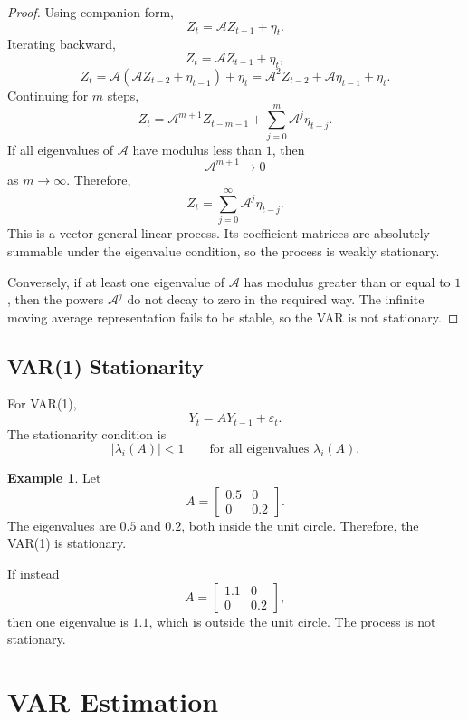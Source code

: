 \documentclass[12pt,oneside]{book}
\numberwithin{equation}{section}
\theoremstyle{definition}
\newtheorem{example}{Example}[section]
\theoremstyle{plain}
\theoremstyle{remark}
\begin{document}
\begin{proof}
Using companion form,
\[
Z_t=\mathcal{A}Z_{t-1}+\eta_t.
\]
Iterating backward,
\[
Z_t
=
\mathcal{A}Z_{t-1}+\eta_t,
\]
\[
Z_t
=
\mathcal{A}(\mathcal{A}Z_{t-2}+\eta_{t-1})+\eta_t
=
\mathcal{A}^2Z_{t-2}
+
\mathcal{A}\eta_{t-1}
+
\eta_t.
\]
Continuing for $m$ steps,
\[
Z_t
=
\mathcal{A}^{m+1}Z_{t-m-1}
+
\sum_{j=0}^{m}\mathcal{A}^j\eta_{t-j}.
\]
If all eigenvalues of $\mathcal{A}$ have modulus less than $1$, then
\[
\mathcal{A}^{m+1}\to 0
\]
as $m\to\infty$. Therefore,
\[
Z_t
=
\sum_{j=0}^{\infty}\mathcal{A}^j\eta_{t-j}.
\]
This is a vector general linear process. Its coefficient matrices are absolutely summable under the eigenvalue condition, so the process is weakly stationary.

Conversely, if at least one eigenvalue of $\mathcal{A}$ has modulus greater than or equal to $1$, then the powers $\mathcal{A}^j$ do not decay to zero in the required way. The infinite moving average representation fails to be stable, so the VAR is not stationary.
\end{proof}

\subsection{VAR(1) Stationarity}

For VAR(1),
\[
Y_t=AY_{t-1}+\varepsilon_t.
\]
The stationarity condition is
\[
|\lambda_i(A)|<1
\qquad
\text{for all eigenvalues } \lambda_i(A).
\]

\begin{example}
Let
\[
A=
\begin{bmatrix}
0.5 & 0\\
0 & 0.2
\end{bmatrix}.
\]
The eigenvalues are $0.5$ and $0.2$, both inside the unit circle. Therefore, the VAR(1) is stationary.

If instead
\[
A=
\begin{bmatrix}
1.1 & 0\\
0 & 0.2
\end{bmatrix},
\]
then one eigenvalue is $1.1$, which is outside the unit circle. The process is not stationary.
\end{example}

\section{VAR Estimation}
\end{document}
